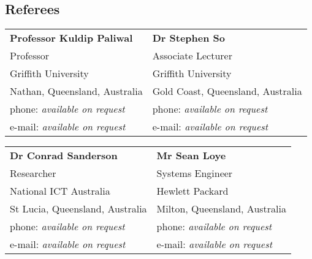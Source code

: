 \documentclass[margin,line]{resume}
\begin{document}
\begin{resume}
\section{\mysidestyle Referees} 

\begin{tabular}{@{}p{6cm}p{6cm}}
\textbf{Professor Kuldip Paliwal}       &  \textbf{Dr Stephen So}                   \\
Professor                               &  Associate Lecturer                       \\
Griffith University                     &  Griffith University                      \\
Nathan, Queensland, Australia           &  Gold Coast, Queensland, Australia        \\
phone: \textsl{available on request}    &  phone: \textsl{available on request}     \\
e-mail: \textsl{available on request}   &  e-mail: \textsl{available on request}    \\
\end{tabular}

\begin{tabular}{@{}p{6cm}p{6cm}}
\textbf{Dr Conrad Sanderson}            &  \textbf{Mr Sean Loye}                    \\
Researcher                              &  Systems Engineer                         \\
National ICT Australia                  &  Hewlett Packard                          \\
St Lucia, Queensland, Australia         &  Milton, Queensland, Australia            \\
phone: \textsl{available on request}    &  phone: \textsl{available on request}     \\
e-mail: \textsl{available on request}   &  e-mail: \textsl{available on request}    \\
\end{tabular}



\end{resume}
\end{document}
